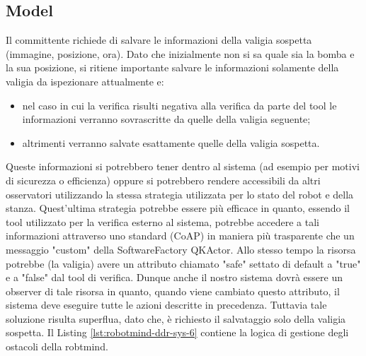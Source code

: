 \subsection{Model}

Il committente richiede di salvare le informazioni della valigia sospetta (immagine, posizione, ora). Dato che inizialmente non si sa quale sia la bomba e la sua posizione, si ritiene importante salvare le informazioni solamente della valigia da ispezionare attualmente e:
\begin{itemize}
    \item nel caso in cui la verifica risulti negativa alla verifica da parte del tool le informazioni verranno sovrascritte da quelle della valigia seguente;
    \item altrimenti verranno salvate esattamente quelle della valigia sospetta.
\end{itemize}

Queste informazioni si potrebbero tener dentro al sistema (ad esempio per motivi di sicurezza o efficienza) oppure si potrebbero rendere accessibili da altri osservatori utilizzando la stessa strategia utilizzata per lo stato del robot e della stanza. Quest'ultima strategia potrebbe essere più efficace in quanto, essendo il tool utilizzato per la verifica esterno al sistema, potrebbe accedere a tali informazioni attraverso uno standard (CoAP) in maniera più trasparente che un messaggio "custom" della SoftwareFactory QKActor. 
Allo stesso tempo la risorsa potrebbe (la valigia) avere un attributo chiamato "safe" settato di default a "true" e a "false" dal tool di verifica. 
Dunque anche il nostro sistema dovrà essere un observer di tale risorsa in quanto, quando viene cambiato questo attributo, il sistema deve eseguire tutte le azioni descritte in precedenza. Tuttavia tale soluzione risulta superflua, dato che, è richiesto il salvataggio solo della valigia sospetta.
Il Listing \ref{lst:robotmind-ddr-sys-6} contiene la logica di gestione degli ostacoli della robtmind.

